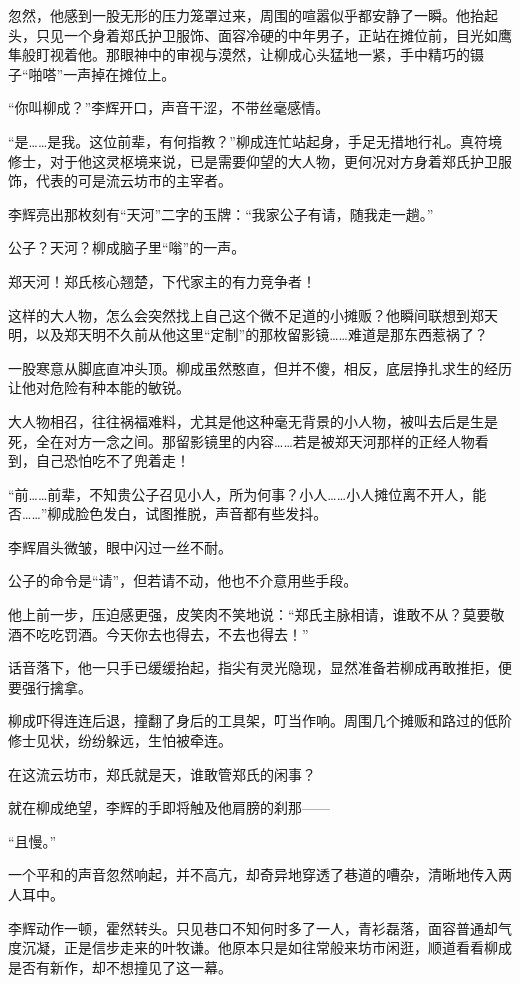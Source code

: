 忽然，他感到一股无形的压力笼罩过来，周围的喧嚣似乎都安静了一瞬。他抬起头，只见一个身着郑氏护卫服饰、面容冷硬的中年男子，正站在摊位前，目光如鹰隼般盯视着他。那眼神中的审视与漠然，让柳成心头猛地一紧，手中精巧的镊子“啪嗒”一声掉在摊位上。

“你叫柳成？”李辉开口，声音干涩，不带丝毫感情。

“是……是我。这位前辈，有何指教？”柳成连忙站起身，手足无措地行礼。真符境修士，对于他这灵枢境来说，已是需要仰望的大人物，更何况对方身着郑氏护卫服饰，代表的可是流云坊市的主宰者。

李辉亮出那枚刻有“天河”二字的玉牌：“我家公子有请，随我走一趟。”

公子？天河？柳成脑子里“嗡”的一声。

郑天河！郑氏核心翘楚，下代家主的有力竞争者！

这样的大人物，怎么会突然找上自己这个微不足道的小摊贩？他瞬间联想到郑天明，以及郑天明不久前从他这里“定制”的那枚留影镜……难道是那东西惹祸了？

一股寒意从脚底直冲头顶。柳成虽然憨直，但并不傻，相反，底层挣扎求生的经历让他对危险有种本能的敏锐。

大人物相召，往往祸福难料，尤其是他这种毫无背景的小人物，被叫去后是生是死，全在对方一念之间。那留影镜里的内容……若是被郑天河那样的正经人物看到，自己恐怕吃不了兜着走！

“前……前辈，不知贵公子召见小人，所为何事？小人……小人摊位离不开人，能否……”柳成脸色发白，试图推脱，声音都有些发抖。

李辉眉头微皱，眼中闪过一丝不耐。

公子的命令是“请”，但若请不动，他也不介意用些手段。

他上前一步，压迫感更强，皮笑肉不笑地说：“郑氏主脉相请，谁敢不从？莫要敬酒不吃吃罚酒。今天你去也得去，不去也得去！”

话音落下，他一只手已缓缓抬起，指尖有灵光隐现，显然准备若柳成再敢推拒，便要强行擒拿。

柳成吓得连连后退，撞翻了身后的工具架，叮当作响。周围几个摊贩和路过的低阶修士见状，纷纷躲远，生怕被牵连。

在这流云坊市，郑氏就是天，谁敢管郑氏的闲事？

就在柳成绝望，李辉的手即将触及他肩膀的刹那——

“且慢。”

一个平和的声音忽然响起，并不高亢，却奇异地穿透了巷道的嘈杂，清晰地传入两人耳中。

李辉动作一顿，霍然转头。只见巷口不知何时多了一人，青衫磊落，面容普通却气度沉凝，正是信步走来的叶牧谦。他原本只是如往常般来坊市闲逛，顺道看看柳成是否有新作，却不想撞见了这一幕。


